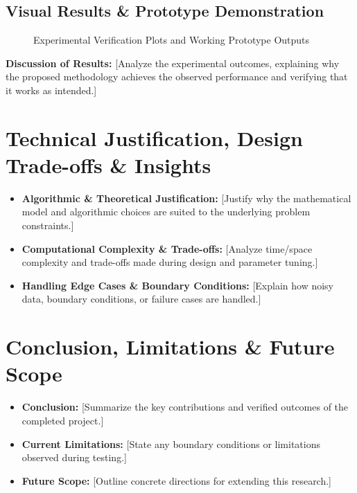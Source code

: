 \documentclass[11pt, a4paper]{article}
\begin{document}
\subsection{Visual Results \& Prototype Demonstration}
\begin{figure}[H]
    \centering
    \caption{Experimental Verification Plots and Working Prototype Outputs}
\end{figure}

\noindent
\textbf{Discussion of Results:} {[Analyze the experimental outcomes, explaining why the proposed methodology achieves the observed performance and verifying that it works as intended.]}

\section{Technical Justification, Design Trade-offs \& Insights}
\begin{itemize}[noitemsep, topsep=2pt]
    \item \textbf{Algorithmic \& Theoretical Justification:} {[Justify why the mathematical model and algorithmic choices are suited to the underlying problem constraints.]}
    \item \textbf{Computational Complexity \& Trade-offs:} {[Analyze time/space complexity and trade-offs made during design and parameter tuning.]}
    \item \textbf{Handling Edge Cases \& Boundary Conditions:} {[Explain how noisy data, boundary conditions, or failure cases are handled.]}
\end{itemize}

\section{Conclusion, Limitations \& Future Scope}
\begin{itemize}[noitemsep, topsep=2pt]
    \item \textbf{Conclusion:} {[Summarize the key contributions and verified outcomes of the completed project.]}
    \item \textbf{Current Limitations:} {[State any boundary conditions or limitations observed during testing.]}
    \item \textbf{Future Scope:} {[Outline concrete directions for extending this research.]}
\end{itemize}
\end{document}

